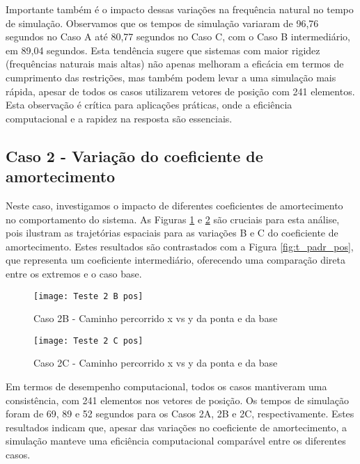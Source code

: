 Importante também é o impacto dessas variações na frequência natural no tempo de simulação. Observamos que os tempos de simulação variaram de 96,76 segundos no Caso A até 80,77 segundos no Caso C, com o Caso B intermediário, em 89,04 segundos. Esta tendência sugere que sistemas com maior rigidez (frequências naturais mais altas) não apenas melhoram a eficácia em termos de cumprimento das restrições, mas também podem levar a uma simulação mais rápida, apesar de todos os casos utilizarem vetores de posição com 241 elementos. Esta observação é crítica para aplicações práticas, onde a eficiência computacional e a rapidez na resposta são essenciais.

\subsection{Caso 2 - Variação do coeficiente de amortecimento}
Neste caso, investigamos o impacto de diferentes coeficientes de amortecimento no comportamento do sistema. As Figuras \ref{fig:t_2b_pos} e \ref{fig:t_2c_pos} são cruciais para esta análise, pois ilustram as trajetórias espaciais para as variações B e C do coeficiente de amortecimento. Estes resultados são contrastados com a Figura \ref{fig:t_padr_pos}, que representa um coeficiente intermediário, oferecendo uma comparação direta entre os extremos e o caso base.

\begin{figure}[H]
    \begin{center}
    \caption{Caso 2B - Caminho percorrido x vs y da ponta e da base}
    \texttt{[image: Teste 2 B pos]}
    \label{fig:t_2b_pos}
    \end{center}
\end{figure}

\begin{figure}[H]
    \begin{center}
    \caption{Caso 2C - Caminho percorrido x vs y da ponta e da base}
    \texttt{[image: Teste 2 C pos]}
    \label{fig:t_2c_pos}
    \end{center}
\end{figure}

Em termos de desempenho computacional, todos os casos mantiveram uma consistência, com 241 elementos nos vetores de posição. Os tempos de simulação foram de 69, 89 e 52 segundos para os Casos 2A, 2B e 2C, respectivamente. Estes resultados indicam que, apesar das variações no coeficiente de amortecimento, a simulação manteve uma eficiência computacional comparável entre os diferentes casos.

